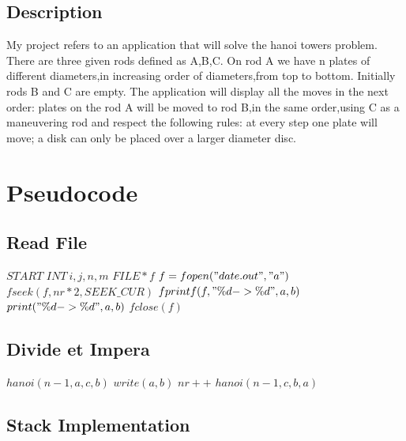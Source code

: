 \documentclass[12]{article}
\begin{document}
\subsection{Description}
\textcolor{white}{}

My project refers to an application that will solve the hanoi towers problem. There are three given rods defined as A,B,C. 
On rod A we have n plates of different diameters,in increasing order of diameters,from top to bottom. Initially rods B and C are empty. 
The application will display all the moves in the next order: plates on the rod A will be moved to rod B,in the same order,using C as a maneuvering rod and respect the following rules: at every step one plate will move; a disk can only be placed over a larger diameter disc.



\newpage
\section{Pseudocode}
\subsection{Read File}
 \begin{algorithmic}[1]
\STATE $START$
\STATE $INT \ i,j,n,m$
 \STATE $FILE  *f$
 \STATE $f=fopen("date.out","a")$
  \STATE $fseek( f , nr * 2 , SEEK\_CUR )$
  \STATE $fprintf(f, "\%d -> \%d ", a, b)$
  \STATE $print("\%d -> \%d ", a, b)$
  \STATE $fclose(f)$
\end{algorithmic}


\subsection{Divide et Impera}
\begin{algorithmic}
    \STATE $hanoi(n-1,a,c,b)$
    \STATE $write( a, b)$
    \STATE $nr++$
    \STATE $hanoi(n-1,c,b,a)$
    \ENDIF
\end{algorithmic}


\subsection{Stack Implementation}
\end{document}
